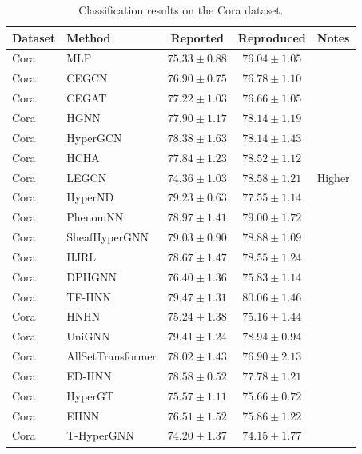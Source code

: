 \begin{table}[H]
    \centering \small
    \renewcommand{\arraystretch}{1.12} 
    \begin{tabular}{llccc}
        \toprule
        Dataset & Method & Reported & Reproduced & Notes \\
        \midrule
        Cora & MLP & \(75.33 \pm 0.88\) & \(76.04 \pm 1.05\) & \\
        Cora & CEGCN & \(76.90 \pm 0.75\) & \(76.78 \pm 1.10\) & \\
        Cora & CEGAT & \(77.22 \pm 1.03\) & \(76.66 \pm 1.05\) & \\
        \grprule
        Cora & HGNN & \(77.90 \pm 1.17\) & \(78.14 \pm 1.19\) & \\
        Cora & HyperGCN & \(78.38 \pm 1.63\) & \(78.14 \pm 1.43\) & \\
        Cora & HCHA & \(77.84 \pm 1.23\) & \(78.52 \pm 1.12\) & \\
        Cora & LEGCN & \(74.36 \pm 1.03\) & \(78.58 \pm 1.21\) & Higher \\
        Cora & HyperND & \(79.23 \pm 0.63\) & \(77.55 \pm 1.14\) & \\
        Cora & PhenomNN & \(78.97 \pm 1.41\) & \(79.00 \pm 1.72\) & \\
        Cora & SheafHyperGNN & \(79.03 \pm 0.90\) & \(78.88 \pm 1.09\) & \\
        Cora & HJRL & \(78.67 \pm 1.47\) & \(78.55 \pm 1.24\) & \\
        Cora & DPHGNN & \(76.40 \pm 1.36\) & \(75.83 \pm 1.14\) & \\
        Cora & TF-HNN & \(79.47 \pm 1.31\) & \(80.06 \pm 1.46\) & \\
        \grprule
        Cora & HNHN & \(75.24 \pm 1.38\) & \(75.16 \pm 1.44\) & \\
        Cora & UniGNN & \(79.41 \pm 1.24\) & \(78.94 \pm 0.94\) & \\
        Cora & AllSetTransformer & \(78.02 \pm 1.43\) & \(76.90 \pm 2.13\) & \\
        Cora & ED-HNN & \(78.58 \pm 0.52\) & \(77.78 \pm 1.21\) & \\
        Cora & HyperGT & \(75.57 \pm 1.11\) & \(75.66 \pm 0.72\) & \\
        \grprule
        Cora & EHNN & \(76.51 \pm 1.52\) & \(75.86 \pm 1.22\) & \\
        Cora & T-HyperGNN & \(74.20 \pm 1.37\) & \(74.15 \pm 1.77\) & \\
        \bottomrule
    \end{tabular}
    \caption{Classification results on the Cora dataset.}
\end{table}

